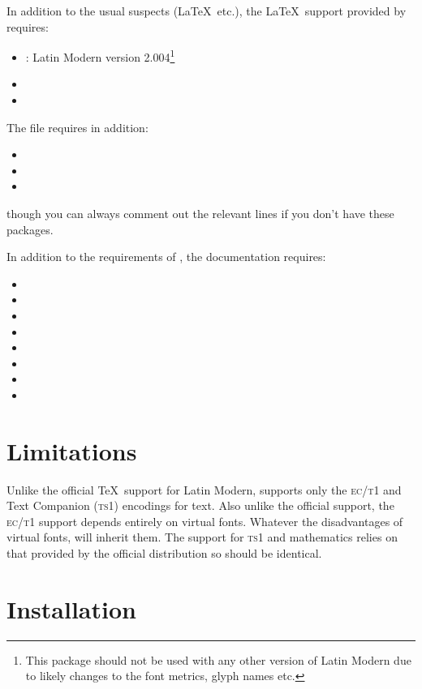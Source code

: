 \documentclass[11pt,british]{article}
\begin{document}
In addition to the usual suspects (\LaTeX\ etc.), the \LaTeX\ support provided by  requires:
\begin{itemize}
	\item {}: Latin Modern version 2.004\footnote{This package should not be used with any other version of Latin Modern due to likely changes to the font metrics, glyph names etc.}
	\item {}
	\item {}
\end{itemize}

The file  requires in addition:
\begin{itemize}
	\item {}
	\item {}
	\item {}
\end{itemize}
though you can always comment out the relevant lines if you don't have these packages.

In addition to the requirements of , the documentation requires:
\begin{itemize}
	\item {}
	\item {}
	\item {}
	\item {}
	\item {}
	\item {}
	\item {}
	\item {}
\end{itemize}

\section{Limitations}

Unlike the official \TeX\ support for Latin Modern,  supports only the \textsc{ec}/\textsc{t1} and Text Companion (\textsc{ts1}) encodings for text. Also unlike the official support, the \textsc{ec}/\textsc{t1} support depends entirely on virtual fonts. Whatever the disadvantages of virtual fonts,  will inherit them. The support for \textsc{ts1} and mathematics relies on that provided by the official distribution so should be identical.

\section{Installation}
\end{document}
